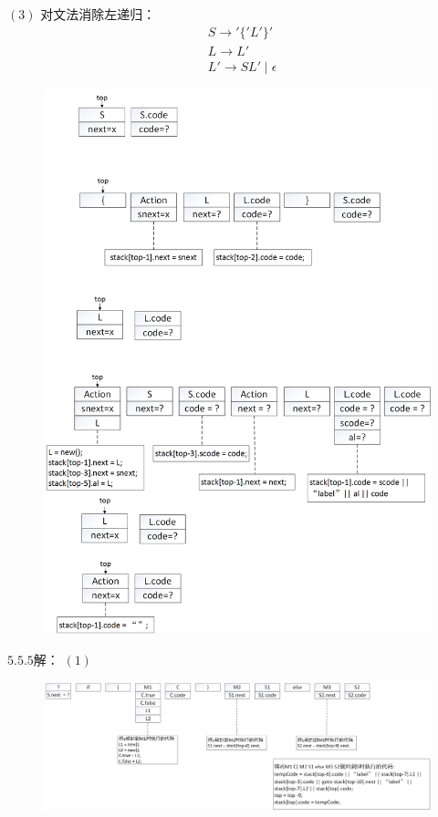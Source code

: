 \documentclass[UTF8,noindent]{ctexart}
\begin{document}
$(3)$
对文法消除左递归：
\begin{align*}
  &S\rightarrow '\{'L'\}'\\
  & L\rightarrow L'\\
  & L'\rightarrow SL'\mid \epsilon
\end{align*}
\begin{figure}[H]
  \centering
  \includegraphics[scale = 0.4]{./fig/5-5-4-c.jpg}
\end{figure}

$5.5.5$解：
$(1)$
\begin{figure}[H]
  \centering
  \includegraphics[scale = 0.3]{./fig/5-5-5-a.jpg}
\end{figure}
\end{document}
